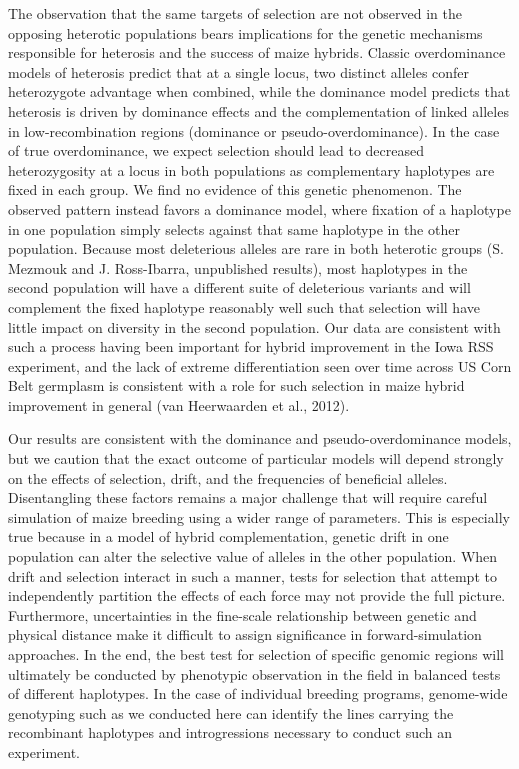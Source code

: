 The observation that the same targets of selection are not observed in the opposing heterotic populations bears implications for the genetic mechanisms responsible for heterosis and the success of maize hybrids. Classic overdominance models of heterosis predict that at a single locus, two distinct alleles confer heterozygote advantage when combined, while the dominance model predicts that heterosis is driven by dominance effects and the complementation of linked alleles in low-recombination regions (dominance or pseudo-overdominance). In the case of true overdominance, we expect selection should lead to decreased heterozygosity at a locus in both populations as complementary haplotypes are fixed in each group. We find no evidence of this genetic phenomenon. The observed pattern instead favors a dominance model, where fixation of a haplotype in one population simply selects against that same haplotype in the other population. Because most deleterious alleles are rare in both heterotic groups (S. Mezmouk and J. Ross-Ibarra, unpublished results), most haplotypes in the second population will have a different suite of deleterious variants and will complement the fixed haplotype reasonably well such that selection will have little impact on diversity in the second population. Our data are consistent with such a process having been important for hybrid improvement in the Iowa RSS experiment, and the lack of extreme differentiation seen over time across US Corn Belt germplasm is consistent with a role for such selection in maize hybrid improvement in general (van Heerwaarden et al., 2012).

Our results are consistent with the dominance and pseudo-overdominance models, but we caution that the exact outcome of particular models will depend strongly on the effects of selection, drift, and the frequencies of beneficial alleles. Disentangling these factors remains a major challenge that will require careful simulation of maize breeding using a wider range of parameters. This is especially true because in a model of hybrid complementation, genetic drift in one population can alter the selective value of alleles in the other population. When drift and selection interact in such a manner, tests for selection that attempt to independently partition the effects of each force may not provide the full picture. Furthermore, uncertainties in the fine-scale relationship between genetic and physical distance make it difficult to assign significance in forward-simulation approaches. In the end, the best test for selection of specific genomic regions will ultimately be conducted by phenotypic observation in the field in balanced tests of different haplotypes. In the case of individual breeding programs, genome-wide genotyping such as we conducted here can identify the lines carrying the recombinant haplotypes and introgressions necessary to conduct such an experiment. 
